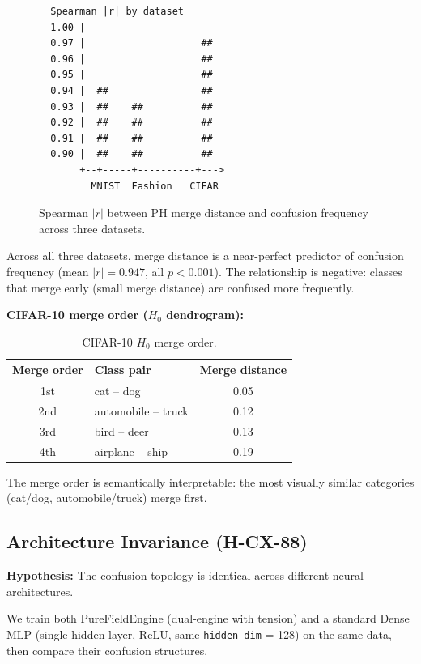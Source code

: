 \documentclass[11pt,a4paper]{article}
\begin{document}
\begin{figure}[htbp]
\centering
\begin{verbatim}
  Spearman |r| by dataset
  1.00 |
  0.97 |                    ##
  0.96 |                    ##
  0.95 |                    ##
  0.94 |  ##                ##
  0.93 |  ##    ##          ##
  0.92 |  ##    ##          ##
  0.91 |  ##    ##          ##
  0.90 |  ##    ##          ##
       +--+-----+----------+--->
         MNIST  Fashion   CIFAR
\end{verbatim}
\caption{Spearman $|r|$ between PH merge distance and confusion frequency across three datasets.}
\label{fig:spearman}
\end{figure}

Across all three datasets, merge distance is a near-perfect predictor of confusion frequency (mean $|r| = 0.947$, all $p < 0.001$). The relationship is negative: classes that merge early (small merge distance) are confused more frequently.

\textbf{CIFAR-10 merge order ($H_0$ dendrogram):}

\begin{table}[htbp]
\centering
\caption{CIFAR-10 $H_0$ merge order.}
\label{tab:cifar-merge}
\begin{tabular}{clc}
\toprule
Merge order & Class pair & Merge distance \\
\midrule
1st & cat -- dog            & 0.05 \\
2nd & automobile -- truck    & 0.12 \\
3rd & bird -- deer           & 0.13 \\
4th & airplane -- ship       & 0.19 \\
\bottomrule
\end{tabular}
\end{table}

The merge order is semantically interpretable: the most visually similar categories (cat/dog, automobile/truck) merge first.

\subsection{Architecture Invariance (H-CX-88)}

\textbf{Hypothesis:} The confusion topology is identical across different neural architectures.

We train both PureFieldEngine (dual-engine with tension) and a standard Dense MLP (single hidden layer, ReLU, same \texttt{hidden\_dim} = 128) on the same data, then compare their confusion structures.
\end{document}
